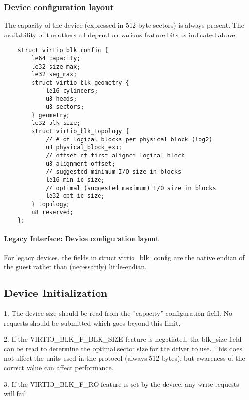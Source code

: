 \subsubsection{Device configuration layout}\label{sec:Device Types / Block Device / Feature bits / Device configuration layout}

The capacity of the device (expressed in 512-byte sectors) is always
present. The availability of the others all depend on various feature
bits as indicated above.

\begin{lstlisting}
	struct virtio_blk_config {
		le64 capacity;
		le32 size_max;
		le32 seg_max;
		struct virtio_blk_geometry {
			le16 cylinders;
			u8 heads;
			u8 sectors;
		} geometry;
		le32 blk_size;
		struct virtio_blk_topology {
			// # of logical blocks per physical block (log2)
			u8 physical_block_exp;
			// offset of first aligned logical block
			u8 alignment_offset;
			// suggested minimum I/O size in blocks
			le16 min_io_size;
			// optimal (suggested maximum) I/O size in blocks
			le32 opt_io_size;
		} topology;
		u8 reserved;
	};
\end{lstlisting}


\paragraph{Legacy Interface: Device configuration layout}\label{sec:Device Types / Block Device / Feature bits / Device configuration layout / Legacy Interface: Device configuration layout}
For legacy devices, the fields in struct virtio_blk_config are the
native endian of the guest rather than (necessarily) little-endian.


\subsection{Device Initialization}\label{sec:Device Types / Block Device / Device Initialization}

1. The device size should be read from the “capacity”
  configuration field. No requests should be submitted which goes
  beyond this limit.

2. If the VIRTIO_BLK_F_BLK_SIZE feature is negotiated, the
  blk_size field can be read to determine the optimal sector size
  for the driver to use. This does not affect the units used in
  the protocol (always 512 bytes), but awareness of the correct
  value can affect performance.

3. If the VIRTIO_BLK_F_RO feature is set by the device, any write
  requests will fail.

